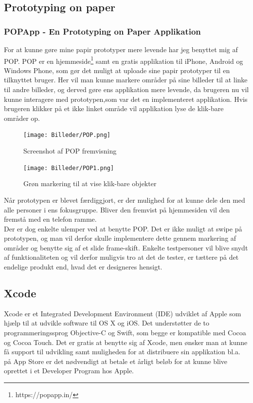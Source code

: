 \documentclass[a4paper,10pt,titlepage]{article}
\begin{document}
\subsection{Prototyping on paper}
\subsubsection{POPApp - En Prototyping on Paper Applikation}
For at kunne gøre mine papir prototyper mere levende har jeg benyttet mig af POP. POP er en hjemmeside\footnote{https://popapp.in/} samt en gratis applikation til iPhone, Android og Windows Phone, som gør det muligt at uploade sine papir prototyper til en tilknyttet bruger. Her vil man kunne markere områder på sine billeder til at linke til andre billeder, og derved gøre ens applikation mere levende, da brugeren nu vil kunne interagere med prototypen,som var det en implementeret applikation. Hvis brugeren klikker på et ikke linket område vil applikation lyse de klik-bare områder op.\\ 
\begin{figure}[H]
\begin{center}
\begin{minipage}{.4\textwidth}
  \texttt{[image: Billeder/POP.png]}
  \caption{Screenshot af POP fremvisning}
 \end{minipage}
 \begin{minipage}{.2\textwidth}
\end{minipage}
 \begin{minipage}{.4\textwidth}
   \vspace{0.15cm}
  \texttt{[image: Billeder/POP1.png]}
  \caption{Grøn markering til at vise klik-bare objekter}
\end{minipage}
\end{center}

\end{figure}
Når prototypen er blevet færdiggjort, er der mulighed for at kunne dele den med alle personer i ens fokusgruppe. Bliver den fremvist på hjemmesiden vil den fremstå med en telefon ramme. \\
Der er dog enkelte ulemper ved at benytte POP. Det er ikke muligt at swipe på prototypen, og man vil derfor skulle implementere dette gennem markering af områder og benytte sig af et slide frame-skift. Enkelte testpersoner vil blive snydt af funktionaliteten og vil derfor muligvis tro at det de tester, er tættere på det endelige produkt end, hvad det er designeres hensigt.

\subsection{Xcode}
Xcode er et Integrated Development Environment  (IDE) udviklet af Apple som hjælp til at udvikle software til OS X og iOS. Det understøtter de to programmeringssprog Objective-C og Swift, som begge er kompatible med Cocoa og Cocoa Touch. Det er gratis at benytte sig af Xcode, men ønsker man at kunne få support til udvikling  samt muligheden for at distribuere sin applikation bl.a. på App Store er det nødvendigt at betale et årligt beløb for at kunne blive oprettet i et Developer Program hos Apple. 
\end{document}

